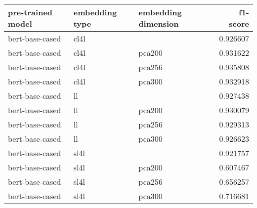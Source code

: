 \begin{tabular}{lllr}
\hline
 pre-trained model   & embedding type   & embedding dimension   &   f1-score \\
\hline
 bert-base-cased     & cl4l             &                       &   0.926607 \\
 bert-base-cased     & cl4l             & pca200                &   0.931622 \\
 bert-base-cased     & cl4l             & pca256                &   0.935808 \\
 bert-base-cased     & cl4l             & pca300                &   0.932918 \\
 bert-base-cased     & ll               &                       &   0.927438 \\
 bert-base-cased     & ll               & pca200                &   0.930079 \\
 bert-base-cased     & ll               & pca256                &   0.929313 \\
 bert-base-cased     & ll               & pca300                &   0.926623 \\
 bert-base-cased     & sl4l             &                       &   0.921757 \\
 bert-base-cased     & sl4l             & pca200                &   0.607467 \\
 bert-base-cased     & sl4l             & pca256                &   0.656257 \\
 bert-base-cased     & sl4l             & pca300                &   0.716681 \\
\hline
\end{tabular}